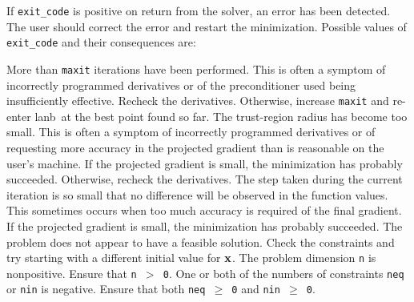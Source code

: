 \documentclass{galahad}
\newcommand{\package}{lanb}
\begin{document}
If {\tt exit\_code} is positive
on return from the solver, an error has been detected.
The user should correct the error and restart the minimization.
Possible values of {\tt exit\_code} and their consequences are:
\begin{description}
 More than {\tt maxit} iterations have been
      performed. This is often a symptom of incorrectly programmed
      derivatives or of the preconditioner used being
      insufficiently effective. Recheck the derivatives.
      Otherwise, increase {\tt maxit} and re-enter \package\
      at the best point found so far.
 The trust-region radius
      has become too small. This is
      often a symptom of incorrectly programmed derivatives
      or of requesting more accuracy in the projected gradient
      than is reasonable on the user's machine.
      If the projected gradient
      is small, the minimization
      has probably succeeded. Otherwise, recheck the derivatives.
\itt{exit\_code $= 3.$} The step taken during the current iteration is so
      small that
      no difference will be observed in the function values.
      This sometimes occurs when too much accuracy is required of
      the final gradient. If the projected gradient
      is small, the minimization has probably succeeded.
 The problem does not appear to have a feasible
     solution. Check the constraints and try starting with a different
     initial value for ${\mathbf{x}}$.
 The problem dimension
     {\tt n} is nonpositive. Ensure that {\tt n $>$ 0}.
 One or both of the numbers of constraints
      {\tt neq} or {\tt nin} is negative. Ensure that both {\tt neq $\geq$ 0}
      and {\tt nin $\geq$ 0}.
\end{description}

\galinfo
\end{document}
